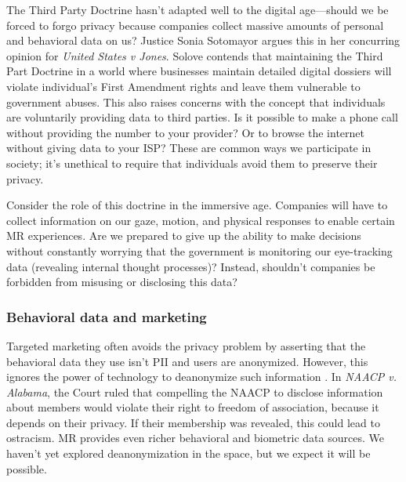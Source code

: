 The Third Party Doctrine hasn't adapted well to the digital age---should we be forced to forgo privacy because companies collect massive amounts of personal and behavioral data on us? Justice Sonia Sotomayor argues this in her concurring opinion for \emph{United States v Jones}\cite{jones2012}. Solove contends that maintaining the Third Part Doctrine in a world where businesses maintain detailed digital dossiers will violate individual's First Amendment rights and leave them vulnerable to government abuses\cite{solove2001digital}. This also raises concerns with the concept that individuals are voluntarily providing data to third parties. Is it possible to make a phone call without providing the number to your provider? Or to browse the internet without giving data to your ISP? These are common ways we participate in society; it's unethical to require that individuals avoid them to preserve their privacy.

Consider the role of this doctrine in the immersive age. Companies will have to collect information on our gaze, motion, and physical responses to enable certain MR experiences. Are we prepared to give up the ability to make decisions without constantly worrying that the government is monitoring our eye-tracking data (revealing internal thought processes)? Instead, shouldn't companies be forbidden from misusing or disclosing this data? 


\subsubsection{Behavioral data and marketing}

Targeted marketing often avoids the privacy problem by asserting that the behavioral data they use isn't PII and users are anonymized. However, this ignores the power of technology to deanonymize such information \cite{narayanan2008robust}. In \emph{NAACP v. Alabama}\cite{1958naacp}, the Court ruled that compelling the NAACP to disclose information about members would violate their right to freedom of association, because it depends on their privacy. If their membership was revealed, this could lead to ostracism. MR provides even richer behavioral and biometric data sources. We haven't yet explored deanonymization in the space, but we expect it will be possible.

